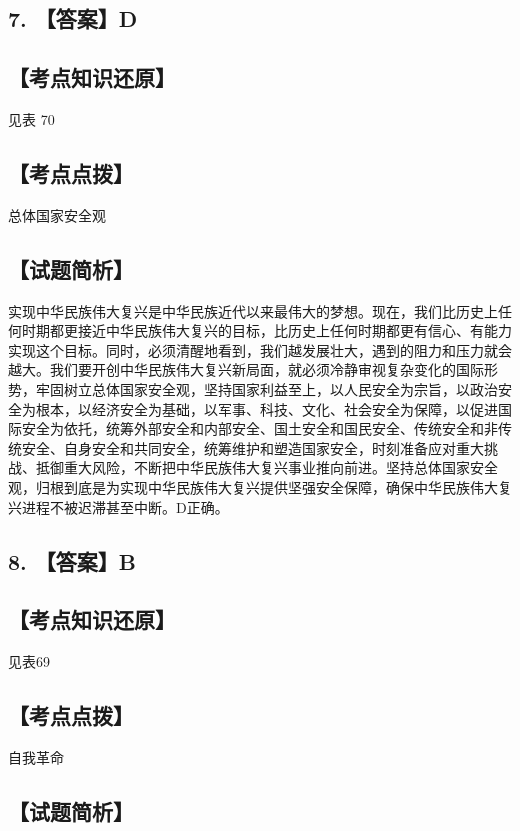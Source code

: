 \documentclass[UTF8,11pt]{ctexart}
\begin{document}
\subsection*{7. 【答案】D}

\subsection*{【考点知识还原】}

见表 70


\subsection*{【考点点拨】}

总体国家安全观


\subsection*{【试题简析】}

实现中华民族伟大复兴是中华民族近代以来最伟大的梦想。现在，我们比历史上任何时期都更接近中华民族伟大复兴的目标，比历史上任何时期都更有信心、有能力实现这个目标。同时，必须清醒地看到，我们越发展壮大，遇到的阻力和压力就会越大。我们要开创中华民族伟大复兴新局面，就必须冷静审视复杂变化的国际形势，牢固树立总体国家安全观，坚持国家利益至上，以人民安全为宗旨，以政治安全为根本，以经济安全为基础，以军事、科技、文化、社会安全为保障，以促进国际安全为依托，统筹外部安全和内部安全、国土安全和国民安全、传统安全和非传统安全、自身安全和共同安全，统筹维护和塑造国家安全，时刻准备应对重大挑战、抵御重大风险，不断把中华民族伟大复兴事业推向前进。坚持总体国家安全观，归根到底是为实现中华民族伟大复兴提供坚强安全保障，确保中华民族伟大复兴进程不被迟滞甚至中断。D正确。


\subsection*{8. 【答案】B}

\subsection*{【考点知识还原】}

见表69


\subsection*{【考点点拨】}

自我革命


\subsection*{【试题简析】}
\end{document}
